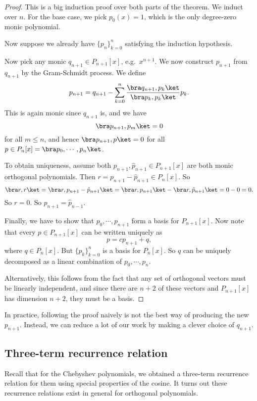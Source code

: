 \documentclass[a4paper]{article}
\begin{document}
\begin{proof}
  This is a big induction proof over both parts of the theorem. We induct over $n$. For the base case, we pick $p_0(x) = 1$, which is the only degree-zero monic polynomial.

  Now suppose we already have $\{p_n\}_{k = 0}^n$ satisfying the induction hypothesis.

  Now pick any monic $q_{n + 1} \in P_{n + 1}[x]$, e.g.\ $x^{n + 1}$. We now construct $p_{n + 1}$ from $q_{n + 1}$ by the Gram-Schmidt process. We define
  \[
    p_{n + 1} = q_{n + 1} - \sum_{k = 0}^n \frac{\bra q_{n + 1}, p_k\ket}{\bra p_k, p_k\ket} p_k.
  \]
  This is again monic since $q_{n + 1}$ is, and we have
  \[
    \bra p_{n + 1}, p_m \ket = 0
  \]
  for all $m \leq n$, and hence $\bra p_{n + 1}, p\ket = 0$ for all $p \in P_n[x] = \bra p_0, \cdots,p_n\ket$.

  To obtain uniqueness, assume both $p_{n + 1}, \hat{p}_{n + 1} \in P_{n + 1}[x]$ are both monic orthogonal polynomials. Then $r = p_{n + 1} - \hat{p}_{n + 1} \in P_n[x]$. So
  \[
    \bra r, r\ket = \bra r, p_{n + 1} - \hat{p}_{n + 1}\ket = \bra r, p_{n + 1}\ket - \bra r, \hat{p}_{n + 1}\ket = 0 - 0 = 0.
  \]
  So $r = 0$. So $p_{n + 1} = \hat{p}_{n - 1}$.

  Finally, we have to show that $p_0, \cdots, p_{n + 1}$ form a basis for $P_{n + 1}[x]$. Now note that every $p \in P_{n + 1}[x]$ can be written uniquely as
  \[
    p = cp_{n + 1} + q,
  \]
  where $q \in P_n[x]$. But $\{p_k\}_{k = 0}^n$ is a basis for $P_n[x]$. So $q$ can be uniquely decomposed as a linear combination of $p_0, \cdots, p_n$.

  Alternatively, this follows from the fact that any set of orthogonal vectors must be linearly independent, and since there are $n + 2$ of these vectors and $P_{n + 1}[x]$ has dimension $n + 2$, they must be a basis.
\end{proof}

In practice, following the proof naively is not the best way of producing the new $p_{n + 1}$. Instead, we can reduce a lot of our work by making a clever choice of $q_{n + 1}$.

\subsection{Three-term recurrence relation}
Recall that for the Chebyshev polynomials, we obtained a three-term recurrence relation for them using special properties of the cosine. It turns out these recurrence relations exist in general for orthogonal polynomials.
\end{document}
